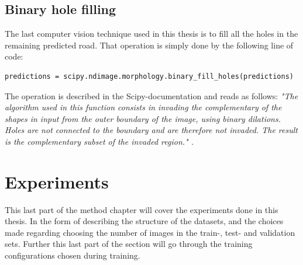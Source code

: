 \documentclass[USenglish]{ifimaster}  %
\begin{document}
\subsection{Binary hole filling}
The last computer vision technique used in this thesis is to fill all the holes in the remaining predicted road. That operation is simply done by the following line of code:
\begin{verbatim}
predictions = scipy.ndimage.morphology.binary_fill_holes(predictions)
\end{verbatim}

The operation is described in the Scipy-documentation and reads as follows:
\newline
\newline
\textit{"The algorithm used in this function consists in invading the complementary of the shapes in input from the outer boundary of the image, using binary dilations. Holes are not connected to the boundary and are therefore not invaded. The result is the complementary subset of the invaded region." \cite{website:scipy}.} 

\section{Experiments}
This last part of the method chapter will cover the experiments done in this thesis. In the form of describing the structure of the datasets, and the choices made regarding choosing the number of images in the train-, test- and validation sets. Further this last part of the section will go through the training configurations chosen during training.  
\end{document}
